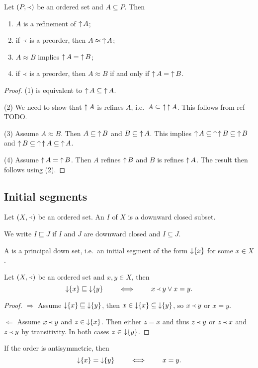 \begin{lemma}
Let $\left( P,\Yleft \right)$ be an ordered set and $A \subseteq P$. Then
\begin{enumerate}
\item $A$ is a refinement of $\operatorname{\uparrow} A$;
\item if $\Yleft$ is a preorder, then $A \approx \operatorname{\uparrow} A$;
\item $A \approx B$ implies $\operatorname{\uparrow} A = \operatorname{\uparrow} B$;
\item if $\Yleft$ is a preorder, then $A \approx B$ \textup{if and only if} $\operatorname{\uparrow} A = \operatorname{\uparrow} B$.
\end{enumerate}
\end{lemma}
\begin{proof}
(1) is equivalent to $\operatorname{\uparrow} A \subseteq \operatorname{\uparrow} A$.

(2) We need to show that $\operatorname{\uparrow} A$ is refines $A$, i.e.\ $A\subseteq \operatorname{\uparrow}\operatorname{\uparrow} A$. This follows from ref TODO.

(3) Assume $A \approx B$. Then $A \subseteq \operatorname{\uparrow} B$ and $B \subseteq \operatorname{\uparrow} A$. This implies $\operatorname{\uparrow} A \subseteq \operatorname{\uparrow}\operatorname{\uparrow} B \subseteq \operatorname{\uparrow} B$ and $\operatorname{\uparrow} B \subseteq \operatorname{\uparrow}\operatorname{\uparrow} A \subseteq \operatorname{\uparrow} A$.

(4) Assume $\operatorname{\uparrow} A = \operatorname{\uparrow} B$. Then $A$ refines $\operatorname{\uparrow} B$ and $B$ is refines $\operatorname{\uparrow} A$. The result then follows using (2).
\end{proof}

\subsection{Initial segments}
\begin{definition}
Let $(X,\Yleft)$ be an ordered set. An  $I$ of $X$ is a downward closed subset.

We write $I \sqsubseteq J$ if $I$ and $J$ are downward closed and $I\subseteq J$.

A  is a principal down set, i.e.\ an initial segment of the form $\operatorname{\downarrow}\{x\}$ for some $x\in X$.
\end{definition}

\begin{lemma} \label{orderingInitialSegments}
Let $\left( X,\Yleft \right)$ be an ordered set and $x,y\in X$, then
\[ \operatorname{\downarrow}\{x\} \sqsubseteq \operatorname{\downarrow}\{y\} \qquad\iff\qquad x \Yleft y \lor x=y. \]
\end{lemma}
\begin{proof}
$\boxed{\Rightarrow}$ Assume $\operatorname{\downarrow}\{x\} \sqsubseteq \operatorname{\downarrow}\{y\}$, then $x\in \operatorname{\downarrow}\{x\} \subseteq \operatorname{\downarrow}\{y\}$, so $x\Yleft y$ or $x=y$.

$\boxed{\Leftarrow}$ Assume $x \Yleft y$ and $z\in \operatorname{\downarrow}\{x\}$. Then either $z=x$ and thus $z\Yleft y$ or $z\Yleft x$ and $z\Yleft y$ by transitivity. In both cases $z\in \operatorname{\downarrow}\{y\}$. 
\end{proof}
\begin{corollary}
If the order is antisymmetric, then
\[ \operatorname{\downarrow}\{x\} = \operatorname{\downarrow}\{y\} \qquad\iff\qquad x = y. \]
\end{corollary}


